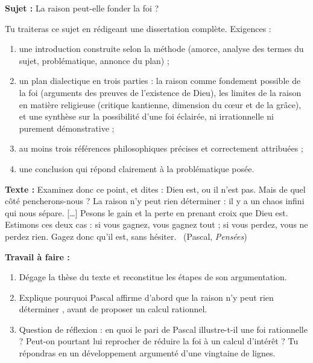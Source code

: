 \documentclass[11pt]{article}
\newcounter{popsec}
\newcounter{popsub}
\newcommand{\courssub}[1]{%
  \stepcounter{popsub}%
  \par\vspace{9pt}\noindent{\popxbold\fontsize{11.5}{13}\selectfont\color{popink}{\color{poporange}\thepopsec.\thepopsub}\hspace{6pt}#1}\par\nopagebreak\vspace{4pt}
}
\begin{document}
\courssub{Je me prépare au Bac}

\begin{exercice}
\textbf{Sujet :} La raison peut-elle fonder la foi ?
\par\medskip
Tu traiteras ce sujet en rédigeant une dissertation complète. Exigences :
\begin{enumerate}
\item une introduction construite selon la méthode (amorce, analyse des termes du sujet, problématique, annonce du plan) ;
\item un plan dialectique en trois parties : la raison comme fondement possible de la foi (arguments des preuves de l'existence de Dieu), les limites de la raison en matière religieuse (critique kantienne, dimension du cœur et de la grâce), et une synthèse sur la possibilité d'une foi éclairée, ni irrationnelle ni purement démonstrative ;
\item au moins trois références philosophiques précises et correctement attribuées ;
\item une conclusion qui répond clairement à la problématique posée.
\end{enumerate}
\end{exercice}

\begin{exercice}
\textbf{Texte :} \guillemotleft Examinez donc ce point, et dites : Dieu est, ou il n'est pas. Mais de quel côté pencherons-nous ? La raison n'y peut rien déterminer : il y a un chaos infini qui nous sépare. [\dots] Pesons le gain et la perte en prenant croix que Dieu est. Estimons ces deux cas : si vous gagnez, vous gagnez tout ; si vous perdez, vous ne perdez rien. Gagez donc qu'il est, sans hésiter. \guillemotright\ (Pascal, \emph{Pensées})
\par\medskip
\textbf{Travail à faire :}
\begin{enumerate}
\item Dégage la thèse du texte et reconstitue les étapes de son argumentation.
\item Explique pourquoi Pascal affirme d'abord que \guillemotleft la raison n'y peut rien déterminer \guillemotright, avant de proposer un calcul rationnel.
\item Question de réflexion : en quoi le pari de Pascal illustre-t-il une foi rationnelle ? Peut-on pourtant lui reprocher de réduire la foi à un calcul d'intérêt ? Tu répondras en un développement argumenté d'une vingtaine de lignes.
\end{enumerate}
\end{exercice}
\end{document}
